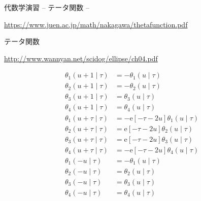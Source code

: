 \documentclass[12pt,b5paper]{ltjsarticle}
\begin{document}
代数学演習
– テータ関数 –

\url{https://www.juen.ac.jp/math/nakagawa/thetafunction.pdf}

テータ関数

\url{http://www.wannyan.net/scidog/ellipse/ch04.pdf}

\hrulefill

\begin{align}
    \theta_{1}(u+1\mid\tau)
    &= -\theta_{1}(u\mid\tau)\\
    \theta_{2}(u+1\mid\tau)
    &= -\theta_{2}(u\mid\tau)\\
    \theta_{3}(u+1\mid\tau)
    &= \theta_{3}(u\mid\tau)\\
    \theta_{4}(u+1\mid\tau)
    &= \theta_{4}(u\mid\tau)\\
    \theta_{1}(u+\tau\mid\tau)
    &= -\mathrm{e}\left[-\tau-2u\right]\theta_{1}(u\mid\tau)\\
    \theta_{2}(u+\tau\mid\tau)
    &= \mathrm{e}[-\tau-2u]\theta_{2}(u\mid\tau)\\
    \theta_{3}(u+\tau\mid\tau)
    &= \mathrm{e}[-\tau-2u]\theta_{3}(u\mid\tau)\\
    \theta_{4}(u+\tau\mid\tau)
    &= -\mathrm{e}\left[-\tau-2u\right]\theta_{4}(u\mid\tau)\\
 \theta_{1}(-u\mid\tau) &= -\theta_{1}(u\mid\tau)\\
 \theta_{2}(-u\mid\tau) &= \theta_{2}(u\mid\tau)\\
 \theta_{3}(-u\mid\tau) &= \theta_{3}(u\mid\tau)\\
 \theta_{4}(-u\mid\tau) &= \theta_{4}(u\mid\tau)
\end{align}

\hrulefill
\end{document}
